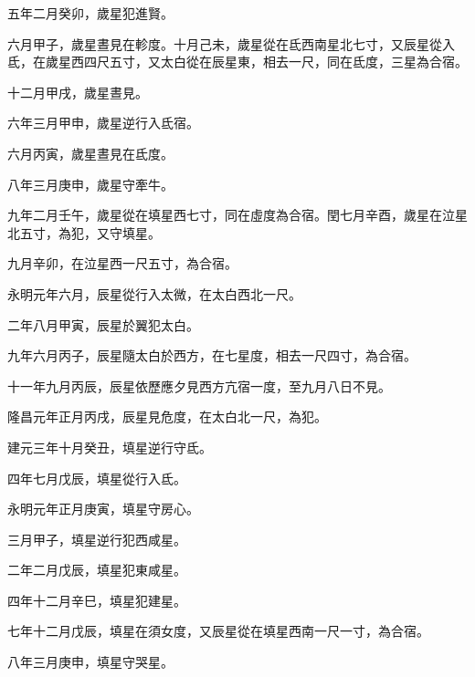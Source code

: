\begin{pinyinscope}
 五年二月癸卯，歲星犯進賢。



 六月甲子，歲星晝見在軫度。十月己未，歲星從在氐西南星北七寸，又辰星從入氐，在歲星西四尺五寸，又太白從在辰星東，相去一尺，同在氐度，三星為合宿。



 十二月甲戌，歲星晝見。



 六年三月甲申，歲星逆行入氐宿。



 六月丙寅，歲星晝見在氐度。



 八年三月庚申，歲星守牽牛。



 九年二月壬午，歲星從在填星西七寸，同在虛度為合宿。閏七月辛酉，歲星在泣星北五寸，為犯，又守填星。



 九月辛卯，在泣星西一尺五寸，為合宿。



 永明元年六月，辰星從行入太微，在太白西北一尺。



 二年八月甲寅，辰星於翼犯太白。



 九年六月丙子，辰星隨太白於西方，在七星度，相去一尺四寸，為合宿。



 十一年九月丙辰，辰星依歷應夕見西方亢宿一度，至九月八日不見。



 隆昌元年正月丙戌，辰星見危度，在太白北一尺，為犯。



 建元三年十月癸丑，填星逆行守氐。



 四年七月戊辰，填星從行入氐。



 永明元年正月庚寅，填星守房心。



 三月甲子，填星逆行犯西咸星。



 二年二月戊辰，填星犯東咸星。



 四年十二月辛巳，填星犯建星。



 七年十二月戊辰，填星在須女度，又辰星從在填星西南一尺一寸，為合宿。



 八年三月庚申，填星守哭星。




\end{pinyinscope}
